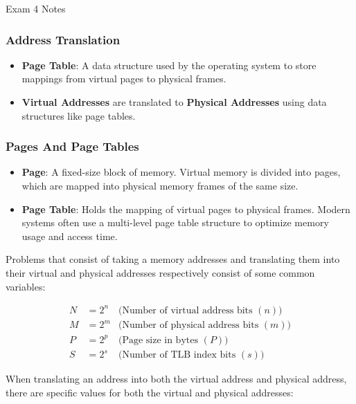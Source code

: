 \begin{examnotes}{Exam 4 Notes}
    \subsubsection*{Address Translation}

    \begin{itemize}
        \item \textbf{Page Table}: A data structure used by the operating system to store mappings from virtual pages to physical frames.
        \item \textbf{Virtual Addresses} are translated to \textbf{Physical Addresses} using data structures like page tables.
    \end{itemize}

    \subsubsection*{Pages And Page Tables}

    \begin{itemize}
        \item \textbf{Page}: A fixed-size block of memory. Virtual memory is divided into pages, which are mapped into physical memory frames of the same size.
        \item \textbf{Page Table}: Holds the mapping of virtual pages to physical frames. Modern systems often use a multi-level page table structure to optimize memory usage and access time.
    \end{itemize}

    \begin{highlight}
        Problems that consist of taking a memory addresses and translating them into their virtual and physical addresses respectively consist of some common variables:

        \begin{center}
            \begin{highlightenv}
                \begin{align*}
                    N & = 2^{n} & \text{(Number of virtual address bits $(n)$)} \\
                    M & = 2^{m} & \text{(Number of physical address bits $(m)$)} \\
                    P & = 2^{p} & \text{(Page size in bytes $(P)$)} \\
                    S & = 2^{s} & \text{(Number of TLB index bits $(s)$)}
                \end{align*}
            \end{highlightenv}
        \end{center}
        When translating an address into both the virtual address and physical address, there are specific values for both the virtual and physical addresses:


\end{highlight}
\end{examnotes}
